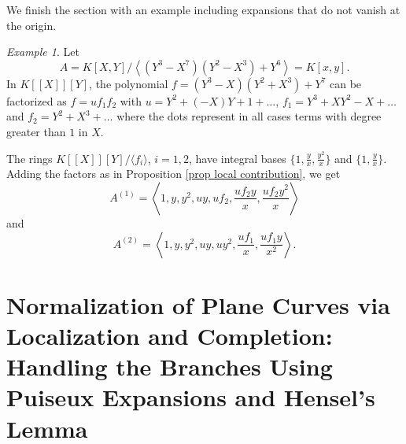 \documentclass[a4paper,11pt]{amsart}%
\theoremstyle{definition}
\theoremstyle{plain}
\theoremstyle{remark}
\newtheorem{example}[defn]{Example}
\begin{document}
We finish the section with an example including expansions that do not vanish at the origin.

\begin{example}
\label{exampleTwoBranchesB} Let
\[
 A = K[X,Y]/\left\langle (Y^{3}-X^{7})(Y^{2}-X^{3})+Y^{6}\right\rangle
 =K[x,y]\text{.}%
 \]
In $K[[X]][Y]$, the polynomial $f = (Y^{3}-X)(Y^{2}+X^{3}) + Y^{7}$
can be factorized as $f = u f_1 f_2$ with 
$u = Y^2 + (-X) Y + 1 + \dots$, $f_1 = Y^3 + X Y^2 -X + \dots$ and $f_2 = Y^2 + X^3 + \dots$ where the dots represent in all cases terms with degree greater than $1$ in $X$.

The rings $K[[X]][Y] / \langle f_i \rangle$, $i = 1, 2$, have integral bases $\{1, \frac{y}{x}, \frac{y^2}{x}\}$ and $\{1, \frac{y}{x}\}$. Adding the factors as in Proposition \ref{prop local contribution}, we get 
\[
A^{(1)} = \left\langle 1, y, y^2, uy, u f_2, \frac{u f_2 y}{x}, \frac{u f_2 y^2}{x} \right\rangle 
\]
and 
\[
A^{(2)} = \left\langle 1, y, y^2, uy, u y^2, \frac{u f_1}{x}, \frac{u f_1 y}{x^2} \right\rangle.
\]
\end{example}



\section{Normalization of Plane Curves via Localization and Completion: 
Handling the Branches Using Puiseux Expansions 
and Hensel's Lemma}

\label{sect:loc-contr-via-Hensel}
\end{document}
